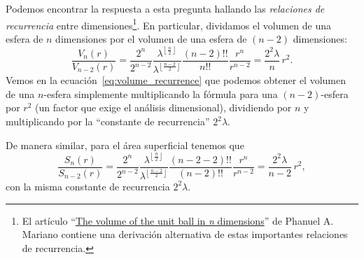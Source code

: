 Podemos encontrar la respuesta a esta pregunta hallando las \emph{relaciones de recurrencia} entre dimensiones\footnote{El artículo ``\href{http://www2.math.uconn.edu/~mariano/research/MathClubsp14\%20.pdf}{The volume of the unit ball in \emph{n} dimensions}'' de Phanuel A. Mariano contiene una derivación alternativa de estas importantes relaciones de recurrencia.}. En particular, dividamos el volumen de una esfera de $n$ dimensiones por el volumen de una esfera de $(n-2)$ dimensiones:
\begin{equation}
\label{eq:volume_recurrence}
\frac{V_n(r)}{V_{n-2}(r)} =
\frac{2^n}{2^{n-2}}
\frac{\lambda^{\left\lfloor \frac{n}{2} \right\rfloor}}{\lambda^{\left\lfloor \frac{n-2}{2} \right\rfloor}}
\frac{(n-2)!!}{n!!}
\frac{r^{n}}{r^{n-2}}
=
\frac{2^2\lambda}{n}\,r^2.
\end{equation}
Vemos en la ecuación~\eqref{eq:volume_recurrence} que podemos obtener el volumen de una $n$-esfera simplemente multiplicando la fórmula para una $(n-2)$-esfera por $r^2$ (un factor que exige el análisis dimensional), dividiendo por $n$ y multiplicando por la ``constante de recurrencia'' $2^2\lambda$.

De manera similar, para el área superficial tenemos que
\begin{equation}
\label{eq:surface_area_recurrence}
\frac{S_n(r)}{S_{n-2}(r)} =
\frac{2^n}{2^{n-2}}
\frac{\lambda^{\left\lfloor \frac{n}{2} \right\rfloor}}{\lambda^{\left\lfloor \frac{n-2}{2} \right\rfloor}}
\frac{(n-2-2)!!}{(n-2)!!}
\frac{r^{n}}{r^{n-2}}
=
\frac{2^2\lambda}{n-2}\,r^2,
\end{equation}
con la misma constante de recurrencia $2^2\lambda$.

